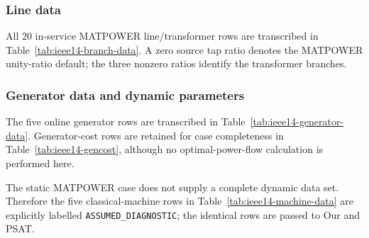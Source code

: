 \documentclass[12pt,a4paper]{article}
\begin{document}
\begin{table}[H]\centering\scriptsize
\caption{MATPOWER IEEE14 bus data: complete bus-matrix parameters supplied to
the case converter.}
\label{tab:ieee14-bus-parameters}
\resizebox{\textwidth}{!}{}
\end{table}

\subsubsection{Line data}

All 20 in-service MATPOWER line/transformer rows are transcribed in
Table~\ref{tab:ieee14-branch-data}. A zero source tap ratio denotes the
MATPOWER unity-ratio default; the three nonzero ratios identify the
transformer branches.

\begin{table}[H]\centering\scriptsize
\caption{MATPOWER IEEE14 line and transformer data (branch matrix); all
20 rows are in service.}
\label{tab:ieee14-branch-data}
\resizebox{\textwidth}{!}{}
\end{table}

\subsubsection{Generator data and dynamic parameters}

The five online generator rows are transcribed in
Table~\ref{tab:ieee14-generator-data}. Generator-cost rows are retained for
case completeness in Table~\ref{tab:ieee14-gencost}, although no
optimal-power-flow calculation is performed here.

\begin{table}[H]\centering\scriptsize
\caption{MATPOWER IEEE14 online generator data.}
\label{tab:ieee14-generator-data}
\resizebox{\textwidth}{!}{}
\end{table}

\begin{table}[H]\centering\small
\caption{MATPOWER IEEE14 polynomial generator-cost data retained from the
source case.}
\label{tab:ieee14-gencost}
\resizebox{.86\textwidth}{!}{}
\end{table}

The static MATPOWER case does not supply a complete dynamic data set.
Therefore the five classical-machine rows in
Table~\ref{tab:ieee14-machine-data} are explicitly labelled
\texttt{ASSUMED\_DIAGNOSTIC}; the identical rows are passed to Our and PSAT.
\end{document}
